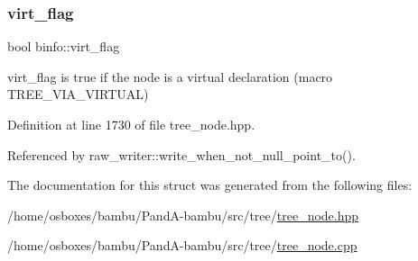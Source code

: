 \mbox{\label{structbinfo_a7e32edd1e2082ee08e33ac3cfb3e2136}} 
\subsubsection{\texorpdfstring{virt\+\_\+flag}{virt\_flag}}
{\footnotesize\ttfamily bool binfo\+::virt\+\_\+flag}



virt\+\_\+flag is true if the node is a virtual declaration (macro T\+R\+E\+E\+\_\+\+V\+I\+A\+\_\+\+V\+I\+R\+T\+U\+AL) 



Definition at line 1730 of file tree\+\_\+node.\+hpp.



Referenced by raw\+\_\+writer\+::write\+\_\+when\+\_\+not\+\_\+null\+\_\+point\+\_\+to().



The documentation for this struct was generated from the following files\+:\begin{DoxyCompactItemize}
\item 
/home/osboxes/bambu/\+Pand\+A-\/bambu/src/tree/\hyperlink{tree__node_8hpp}{tree\+\_\+node.\+hpp}\item 
/home/osboxes/bambu/\+Pand\+A-\/bambu/src/tree/\hyperlink{tree__node_8cpp}{tree\+\_\+node.\+cpp}\end{DoxyCompactItemize}
